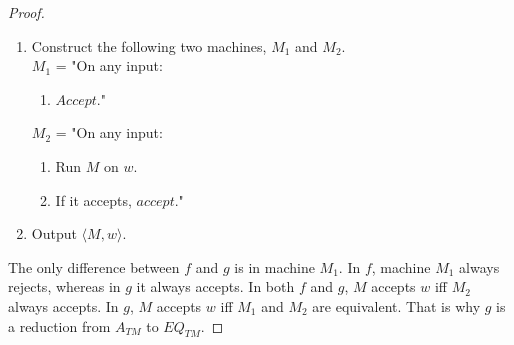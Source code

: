 \documentclass[11pt]{article}
\theoremstyle{definition}
\begin{document}
\begin{proof}
\renewcommand{\labelenumii}{\arabic{enumii}.}
\begin{enumerate}
    \item Construct the following two machines, $M_1$ and $M_2$.\\
    $M_1$ = "On any input:
    \begin{enumerate}
        \item $Accept$."
    \end{enumerate}
    $M_2$ = "On any input:
        \begin{enumerate}
        \item Run $M$ on $w$. 
        \item If it accepts, $accept$."
    \end{enumerate}
    \item Output $\langle M,w\rangle$.
\end{enumerate}
The only difference between $f$ and $g$ is in machine $M_1$. In $f$, machine $M_1$ always rejects, whereas in $g$ it always accepts. In both $f$ and $g$, $M$ accepts $w$ iff $M_2$ always accepts. In $g$, $M$ accepts $w$ iff $M_1$ and $M_2$ are equivalent. That is why $g$ is a reduction from $A_{TM}$ to $EQ_{TM}$.
\end{proof}

\end{document}
